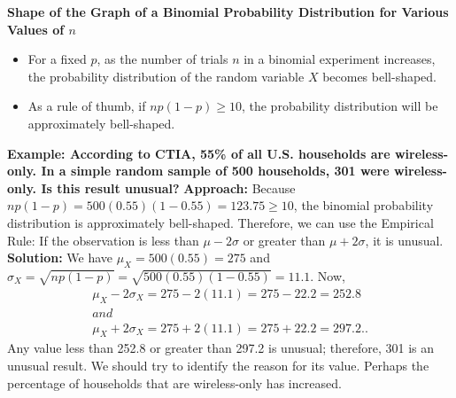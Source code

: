 \documentclass{report}
\begin{document}
      \bigbreak \noindent \bigbreak \noindent 
      \textbf{Shape of the Graph of a Binomial Probability Distribution for Various Values of $n $ }
      \bigbreak \noindent 
      \begin{itemize}
          \item For a fixed $p$, as the number of trials $n $ in a binomial experiment increases, the probability distribution of the random variable $X$ becomes bell-shaped.
          \item As a rule of thumb, if $np(1−p) \geq 10$, the probability distribution will be approximately bell-shaped.
      \end{itemize}
      \bigbreak \noindent 

      \pagebreak 
      \bigbreak \noindent 
      \begin{mdframed}
        \textbf{Example: According to CTIA, 55\% of all U.S. households are wireless-only. In a simple random sample of 500 households, 301 were wireless-only. Is this result unusual?}
        \bigbreak \noindent 
        \textbf{Approach:}
        \bigbreak \noindent 
        Because $np(1-p) = 500(0.55)(1-0.55) = 123.75 \geq 10$, the binomial probability distribution is approximately bell-shaped. Therefore, we can use the Empirical Rule: If the observation is less than $\mu - 2\sigma$ or greater than $\mu + 2\sigma$, it is unusual.
        \bigbreak \noindent 
        \textbf{Solution:}
        We have $\mu_X = 500(0.55) = 275$ and $\sigma_X = \sqrt{np(1-p)} = \sqrt{500(0.55)(1-0.55)} = 11.1$. Now,
        \begin{align*}
            \mu_X - 2\sigma_X = 275 - 2(11.1) = 275 - 22.2 = 252.8\\ and\\ \mu_X + 2\sigma_X = 275 + 2(11.1) = 275 + 22.2 = 297.2.
        .\end{align*}
        \bigbreak \noindent 
        Any value less than 252.8 or greater than 297.2 is unusual; therefore, 301 is an unusual result. We should try to identify the reason for its value. Perhaps the percentage of households that are wireless-only has increased.
      \end{mdframed}
\end{document}

